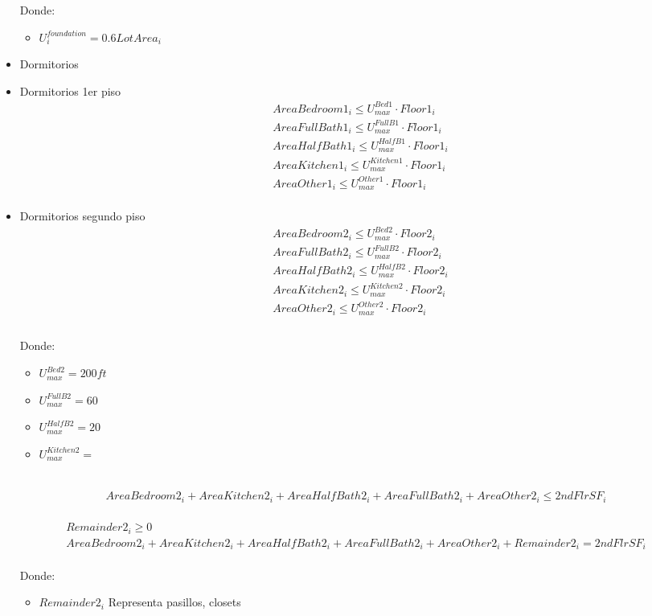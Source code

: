 \begin{itemize}
Donde:
    \begin{itemize}
        \item $U_{i}^{foundation}= 0.6LotArea_{i}$

    \end{itemize}


    \item {Dormitorios}

    \item {Dormitorios 1er piso}
\begin{align}
    &AreaBedroom1_{i} \leq U_{max}^{Bed1} \cdot Floor1_{i}\\
    &AreaFullBath1_{i} \leq U_{max}^{FullB1} \cdot Floor1_{i}\\
    &AreaHalfBath1_{i} \leq U_{max}^{HalfB1} \cdot Floor1_{i}\\
    &AreaKitchen1_{i} \leq U_{max}^{Kitchen1} \cdot Floor1_{i}\\
    &AreaOther1_{i} \leq U_{max}^{Other1} \cdot Floor1_{i}\\
\end{align}

    \item {Dormitorios segundo piso}
\begin{align}
    &AreaBedroom2_{i} \leq U_{max}^{Bed2} \cdot Floor2_{i}\\
    &AreaFullBath2_{i} \leq U_{max}^{FullB2} \cdot Floor2_{i}\\
    &AreaHalfBath2_{i} \leq U_{max}^{HalfB2} \cdot Floor2_{i}\\
    &AreaKitchen2_{i} \leq U_{max}^{Kitchen2} \cdot Floor2_{i}\\
    &AreaOther2_{i} \leq U_{max}^{Other2} \cdot Floor2_{i}\\
\end{align}
\\
Donde:
    \begin{itemize}
        \item $U_{max}^{Bed2}=200 ft$
        \item $U_{max}^{FullB2}=60$
        \item $U_{max}^{HalfB2}=20$
        \item $U_{max}^{Kitchen2}=$
    \end{itemize}
\\
\begin{align}
    AreaBedroom2_{i}+AreaKitchen2_{i}+AreaHalfBath2_{i}+AreaFullBath2_{i}+AreaOther2_{i}\leq 2ndFlrSF_{i}
\end{align}
\\
\begin{align}
    Remainder2_{i}\geq 0\\
    AreaBedroom2_{i}+AreaKitchen2_{i}+AreaHalfBath2_{i}+AreaFullBath2_{i}+AreaOther2_{i}+Remainder2_{i}= 2ndFlrSF_{i}
\end{align}\\
Donde:
    \begin{itemize}
        \item $Remainder2_{i}$ Representa pasillos, closets
    \end{itemize}
\\


\end{itemize}
